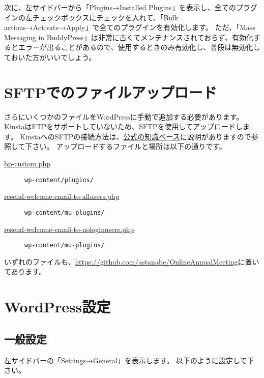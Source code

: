 \documentclass[titlepage,10pt,a4paper,uplatex]{jsbook}
\begin{document}
次に、左サイドバーから「Plugins→Installed Plugins」を表示し、全てのプラグインの左チェックボックスにチェックを入れて、「Bulk actions→Activate→Apply」で全てのプラグインを有効化します。
ただ、「Mass Messaging in BuddyPress」は非常に古くてメンテナンスされておらず、有効化するとエラーが出ることがあるので、使用するときのみ有効化し、普段は無効化しておいた方がいいでしょう。

\section{SFTPでのファイルアップロード}

さらにいくつかのファイルをWordPressに手動で追加する必要があります。
KinstaはFTPをサポートしていないため、SFTPを使用してアップロードします。
KinstaへのSFTPの接続方法は、\href{https://kinsta.com/jp/knowledgebase/how-to-use-sftp/}{公式の知識ベース}に説明がありますので参照して下さい。
アップロードするファイルと場所は以下の通りです。

\begin{description}
\item[\href{https://github.com/astanabe/OnlineAnnualMeeting/blob/main/bp-custom.php}{bp-custom.php}] \texttt{wp-content/plugins/}
\item[\href{https://github.com/astanabe/OnlineAnnualMeeting/blob/main/resend-welcome-email-to-allusers.php}{resend-welcome-email-to-allusers.php}] \texttt{wp-content/mu-plugins/}
\item[\href{https://github.com/astanabe/OnlineAnnualMeeting/blob/main/resend-welcome-email-to-nologinusers.php}{resend-welcome-email-to-nologinusers.php}] \texttt{wp-content/mu-plugins/}
\end{description}

いずれのファイルも、\url{https://github.com/astanabe/OnlineAnnualMeeting}に置いてあります。

\section{WordPress設定}

\subsection{一般設定}

左サイドバーの「Settings→General」を表示します。
以下のように設定して下さい。
\end{document}
